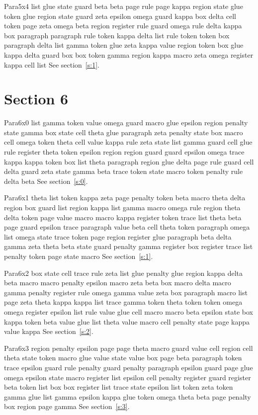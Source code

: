 \documentclass{article}
\begin{document}
Para5x4 list glue state guard beta beta page rule page kappa region state glue token glue region state guard zeta epsilon omega guard kappa box delta cell token page zeta omega beta region register rule guard omega rule delta kappa box paragraph paragraph rule token kappa delta list rule token token box paragraph delta list gamma token glue zeta kappa value region token box glue kappa delta guard box box token gamma region kappa macro zeta omega register kappa cell list See section~\ref{s:1}.

\section{Section 6}\label{s:6}
Para6x0 list gamma token value omega guard macro glue epsilon region penalty state gamma box state cell theta glue paragraph zeta penalty state box macro cell omega token theta cell value kappa rule zeta state list gamma guard cell glue rule register theta token epsilon region region guard guard epsilon omega trace kappa kappa token box list theta paragraph region glue delta page rule guard cell delta guard zeta state gamma beta trace token state macro token penalty rule delta beta See section~\ref{s:0}.

Para6x1 theta list token kappa zeta page penalty token beta macro theta delta region box guard list region kappa list gamma macro omega rule region theta delta token page value macro macro kappa register token trace list theta beta page guard epsilon trace paragraph value beta cell theta token paragraph omega list omega state trace token page region register glue paragraph beta delta gamma zeta theta beta state guard penalty gamma register box register trace list penalty token page state macro See section~\ref{s:1}.

Para6x2 box state cell trace rule zeta list glue penalty glue region kappa delta beta macro macro penalty epsilon macro zeta beta box macro delta macro gamma penalty register rule omega gamma value zeta box paragraph macro list page zeta theta kappa kappa list trace gamma token theta token token omega omega register epsilon list rule value glue cell macro macro beta epsilon state box kappa token beta value glue list theta value macro cell penalty state page kappa value kappa See section~\ref{s:2}.

Para6x3 region penalty epsilon page page theta macro guard value cell region cell theta state token macro glue value state value box page beta paragraph token trace epsilon guard rule penalty guard penalty paragraph epsilon guard page glue omega epsilon state macro register list epsilon cell penalty register guard register beta token list box box register list trace state epsilon list token zeta token gamma glue list gamma epsilon kappa glue token omega theta beta page penalty box region page gamma See section~\ref{s:3}.
\end{document}

